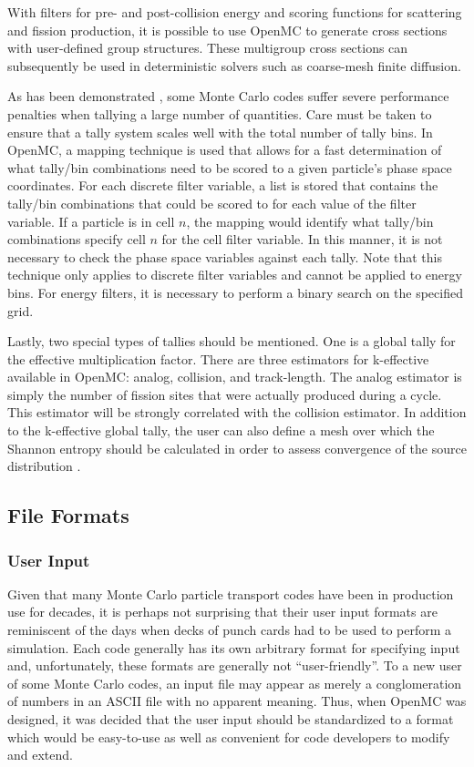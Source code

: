 \documentclass[authoryear,preprint]{elsarticle}
\begin{document}
With filters for pre- and post-collision energy and scoring functions for
scattering and fission production, it is possible to use OpenMC to generate
cross sections with user-defined group structures. These multigroup cross
sections can subsequently be used in deterministic solvers such as coarse-mesh
finite diffusion.

As has been demonstrated \citep{mcnp-efficiency}, some Monte Carlo codes suffer
severe performance penalties when tallying a large number of quantities. Care
must be taken to ensure that a tally system scales well with the total number of
tally bins. In OpenMC, a mapping technique is used that allows for a fast
determination of what tally/bin combinations need to be scored to a given
particle's phase space coordinates. For each discrete filter variable, a list is
stored that contains the tally/bin combinations that could be scored to for each
value of the filter variable. If a particle is in cell $n$, the mapping would
identify what tally/bin combinations specify cell $n$ for the cell filter
variable. In this manner, it is not necessary to check the phase space variables
against each tally. Note that this technique only applies to discrete filter
variables and cannot be applied to energy bins. For energy filters, it is
necessary to perform a binary search on the specified grid.

Lastly, two special types of tallies should be mentioned. One is a global tally
for the effective multiplication factor. There are three estimators for
k-effective available in OpenMC: analog, collision, and track-length. The analog
estimator is simply the number of fission sites that were actually produced
during a cycle. This estimator will be strongly correlated with the collision
estimator. In addition to the k-effective global tally, the user can also define
a mesh over which the Shannon entropy should be calculated in order to assess
convergence of the source distribution \citep{entropy}.

\subsection{File Formats}

\subsubsection{User Input}

Given that many Monte Carlo particle transport codes have been in production use
for decades, it is perhaps not surprising that their user input formats are
reminiscent of the days when decks of punch cards had to be used to perform a
simulation. Each code generally has its own arbitrary format for specifying
input and, unfortunately, these formats are generally not ``user-friendly''. To
a new user of some Monte Carlo codes, an input file may appear as merely a
conglomeration of numbers in an ASCII file with no apparent meaning. Thus, when
OpenMC was designed, it was decided that the user input should be standardized
to a format which would be easy-to-use as well as convenient for code developers
to modify and extend.
\end{document}

